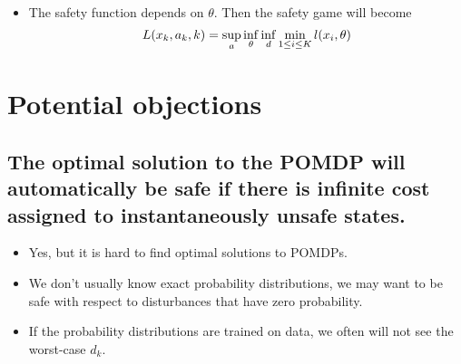 \documentclass{article}
\newcommand{\dstate}{\theta}
\begin{document}
\begin{itemize}
    \item The safety function depends on $\dstate$. Then the safety game will become
\begin{equation}
    L(x_k, a_k, k) = \underset{a}{\sup}\,\underset{\dstate}{\inf}\,\underset{d}{\inf}\,\underset{1\leq i\leq K}{\min}\,l(x_i, \dstate) \\
\end{equation}
\end{itemize}

\section{Potential objections}

\subsection{The optimal solution to the POMDP will automatically be safe if there is infinite cost assigned to instantaneously unsafe states.}

\begin{itemize}
    \item Yes, but it is hard to find optimal solutions to POMDPs.
    \item We don't usually know exact probability distributions, we may want to be safe with respect to disturbances that have zero probability.
    \item If the probability distributions are trained on data, we often will not see the worst-case $d_k$.
\end{itemize}
\end{document}
